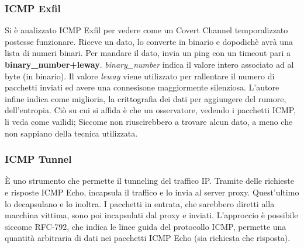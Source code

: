 \subsubsection*{ICMP Exfil} \label{strumenti:ICMPexfill} 
Si è analizzato ICMP Exfil \cite{icmp-exfill} per vedere come un Covert Channel temporalizzato postesse funzionare. 
Riceve un dato, lo converte in binario e dopodichè avrà una lista di numeri binari. 
Per mandare il dato, invia un ping con un timeout pari a \textbf{binary\_number+leway}. 
\vspace{1ex} \newline 
\textit{binary\_number} indica il valore intero associato ad al byte (in binario). 
Il valore \textit{leway} viene utilizzato per rallentare il numero di pacchetti inviati ed avere una connesisone maggiormente silenziosa. 
L'autore infine indica come miglioria, la crittografia dei dati per aggiungere del rumore, dell'entropia. 
\vspace{1ex} \newline 
Ciò su cui si affida è che un osservatore, vedendo i pacchetti ICMP, li veda come vailidi; 
Siccome non riuscirebbero a trovare alcun dato, a meno che non sappiano della tecnica utilizzata. 
\vspace{2ex} \newline 



\subsubsection*{ICMP Tunnel} \label{strumenti:ICMPtunnel}
\MakeUppercase{è} uno strumento \cite{icmp-tunnel} che permette il tunneling del traffico IP. 
Tramite delle richieste e risposte ICMP Echo, incapsula il traffico e lo invia al server proxy. 
Quest'ultimo lo decapsulano e lo inoltra. 
I pacchetti in entrata, che sarebbero diretti alla macchina vittima, sono poi incapsulati dal proxy e inviati. 
L'approccio è possibile siccome RFC-792, che indica le linee guida del protocollo ICMP, permette una quantità arbitraria di dati nei pacchetti ICMP Echo (sia richiesta che risposta). 




